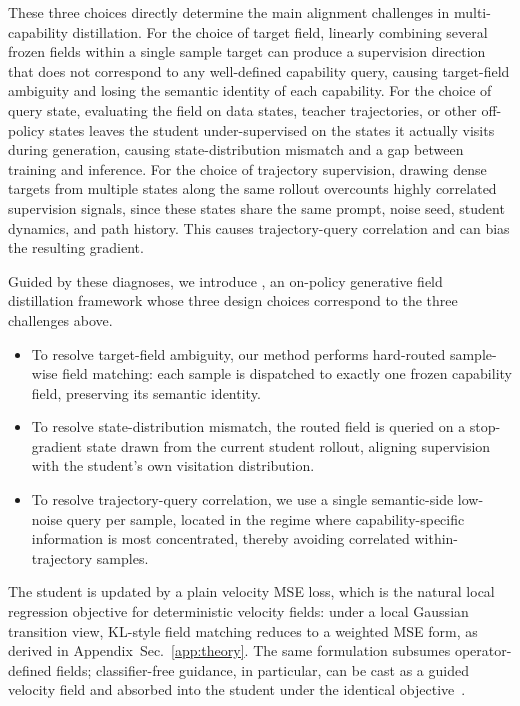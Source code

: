 These three choices directly determine the main alignment challenges in multi-capability distillation. For the choice of target field, linearly combining several frozen fields within a single sample target can produce a supervision direction that does not correspond to any well-defined capability query, causing target-field ambiguity and losing the semantic identity of each capability. For the choice of query state, evaluating the field on data states, teacher trajectories, or other off-policy states leaves the student under-supervised on the states it actually visits during generation, causing state-distribution mismatch and a gap between training and inference. For the choice of trajectory supervision, drawing dense targets from multiple states along the same rollout overcounts highly correlated supervision signals, since these states share the same prompt, noise seed, student dynamics, and path history. This causes trajectory-query correlation and can bias the resulting gradient.


Guided by these diagnoses, we introduce \name{}, an on-policy generative field distillation framework whose three design choices correspond to the three challenges above.
\begin{itemize}
    \item To resolve target-field ambiguity, our method performs hard-routed sample-wise field matching: each sample is dispatched to exactly one frozen capability field, preserving its semantic identity.

    \item To resolve state-distribution mismatch, the routed field is queried on a stop-gradient state drawn from the current student rollout, aligning supervision with the student's own visitation distribution.

    \item To resolve trajectory-query correlation, we use a single semantic-side low-noise query per sample, located in the regime where capability-specific information is most concentrated, thereby avoiding correlated within-trajectory samples.
\end{itemize}


The student is updated by a plain velocity MSE loss, which is the natural local regression objective for deterministic velocity fields: under a local Gaussian transition view, KL-style field matching reduces to a weighted MSE form, as derived in Appendix~Sec.~\ref{app:theory}. The same formulation subsumes operator-defined fields; classifier-free guidance, in particular, can be cast as a guided velocity field and absorbed into the student under the identical objective~\cite{ho2022classifier}.


